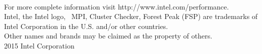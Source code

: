 \newline \\
\noindent For more complete information visit http://www.intel.com/performance.  
\newline \\
\noindent Intel, the Intel logo, \Intel{}~MPI, \Intel{} Cluster Checker, Forest Peak (FSP) are trademarks of Intel Corporation in the U.S. and/or other countries.
\newline \\
\noindent *Other names and brands may be claimed as the property of others.  
\newline \\
\noindent {\small\copyright} 2015 Intel Corporation

